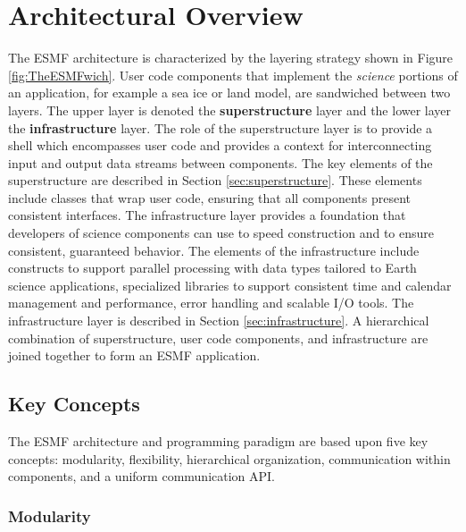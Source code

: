 
\section{Architectural Overview}
\label{sec:ArchOver}
The ESMF architecture is characterized by the layering strategy shown in Figure \ref{fig:TheESMFwich}. User code components that implement the {\it science} portions of an application, for example a sea ice or land model, are sandwiched 
between two layers. The upper layer is denoted the {\bf superstructure} layer 
and the lower layer the {\bf infrastructure} layer. The role of the superstructure layer is to provide a shell which encompasses user code and provides a context for interconnecting input and output
data streams between components. The key elements of the superstructure are described in Section \ref{sec:superstructure}.
These elements include classes that wrap user code, ensuring that all
components present consistent interfaces. The infrastructure layer provides a foundation that developers of
science components can use to speed construction and to ensure consistent, guaranteed behavior.
The elements of the infrastructure include constructs to support parallel processing with data types tailored
to Earth science applications, specialized libraries to support consistent time and calendar management and
performance, error handling and scalable I/O tools. The infrastructure layer is described in 
Section \ref{sec:infrastructure}.
A hierarchical combination of superstructure, user code components, and infrastructure are joined 
together to form an ESMF application.

\subsection{Key Concepts}

The ESMF architecture and programming paradigm are based upon 
five key concepts:  modularity, flexibility, hierarchical 
organization, communication within components, and a uniform 
communication API.  

\subsubsection{Modularity}

